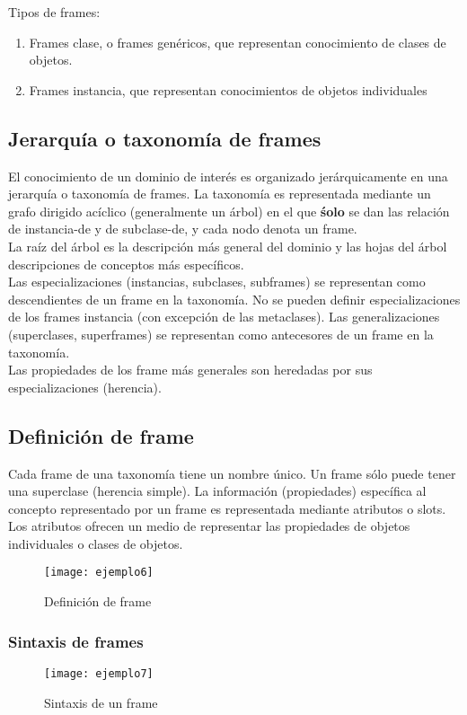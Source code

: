 \documentclass[12pt]{article}
\begin{document}
Tipos de frames:
\begin{enumerate}
\item Frames clase, o frames genéricos, que representan conocimiento de clases de objetos.
\item Frames instancia, que representan conocimientos de objetos individuales
\end{enumerate}

\subsection{Jerarquía o taxonomía de frames}
El conocimiento de un dominio de interés es organizado jerárquicamente en una jerarquía o taxonomía de frames. La taxonomía es representada mediante un grafo dirigido acíclico (generalmente un árbol) en el que \textbf{śolo} se dan las relación de instancia-de y de subclase-de, y cada nodo denota un frame.\\
La raíz del árbol es la descripción más general del dominio y las hojas del árbol descripciones de conceptos más específicos.\\
Las especializaciones (instancias, subclases, subframes) se representan como descendientes de un frame en la taxonomía. No se pueden definir especializaciones de los frames instancia (con excepción de las metaclases). Las generalizaciones (superclases, superframes) se representan como antecesores de un frame en la taxonomía.\\

Las propiedades de los frame más generales son heredadas por sus especializaciones (herencia).

\subsection{Definición de frame}
Cada frame de una taxonomía tiene un nombre único. Un frame sólo puede tener una superclase (herencia simple). La información (propiedades) específica al concepto representado por un frame es representada mediante atributos o slots. Los atributos ofrecen un medio de representar las propiedades de objetos individuales o clases de objetos.

\begin{figure}[H]
\centering
\texttt{[image: ejemplo6]}
\caption{Definición de frame} \label{fig:ejemplo6}
\end{figure}

\subsubsection{Sintaxis de frames}
\begin{figure}[H]
\centering
\texttt{[image: ejemplo7]}
\caption{Sintaxis de un frame} \label{fig:ejemplo7}
\end{figure}
\end{document}
